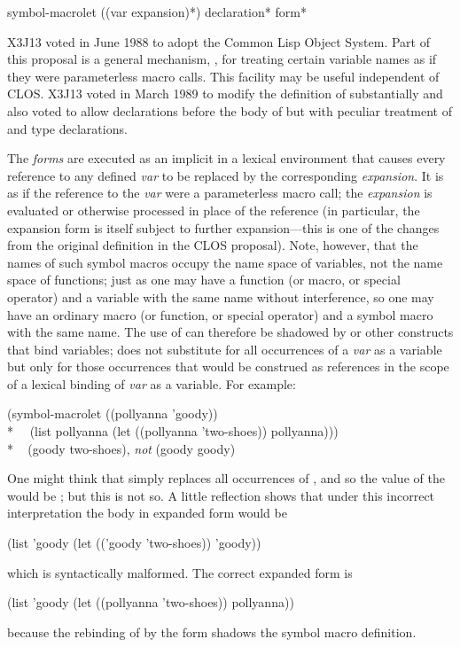 \begin{defspec}
symbol-macrolet ({(var expansion)}*)
                {declaration}* {form}*

X3J13 voted in June 1988
to adopt the Common Lisp Object System.  Part of this proposal
is a general mechanism, ,
for treating certain variable names as if they were
parameterless macro calls.  This facility may be useful independent of CLOS.
X3J13 voted in March 1989
to modify the definition of  substantially
and also voted
 to allow declarations before the body
of  but with peculiar treatment of 
and type declarations.

The \emph{forms} are executed as an implicit  in a lexical
environment that causes every reference to any defined \emph{var}
to be replaced by the corresponding \emph{expansion}.  It is as if
the reference to the \emph{var} were a parameterless macro call;
the \emph{expansion} is evaluated or otherwise processed
in place of the reference
(in particular, the expansion form is itself subject
to further expansion---this is one of the changes
from the
original definition in the CLOS proposal).  Note, however, that the names of
such symbol macros occupy the name space of variables, not the
name space of functions; just as one may have a function
(or macro, or special operator) and a variable
with the same name without interference, so one may have an ordinary
macro (or function, or special operator)
and a symbol macro with the same name.
The use of  can therefore be shadowed by 
or other constructs that bind variables;  does
not substitute for all occurrences of a \emph{var} as a variable
but only for those occurrences that would be construed as
references in the scope of a lexical binding of \emph{var} as
a variable.  For example:
\begin{lisp}
(symbol-macrolet ((pollyanna 'goody)) \\*
~~(list pollyanna (let ((pollyanna 'two-shoes)) pollyanna))) \\*
~{\EV} (goody two-shoes)\textrm{, \emph{not}} (goody goody)
\end{lisp}
One might think that  simply replaces all occurrences of
, and so the value of the  would be
; but this is not so.  A little reflection shows that under
this incorrect interpretation the body in expanded form would be
\begin{lisp}
(list 'goody (let (('goody 'two-shoes)) 'goody))
\end{lisp}
which is syntactically malformed.  The correct expanded form is
\begin{lisp}
(list 'goody (let ((pollyanna 'two-shoes)) pollyanna))
\end{lisp}
because the rebinding of  by the  form
shadows the symbol macro definition.


\end{defspec}
